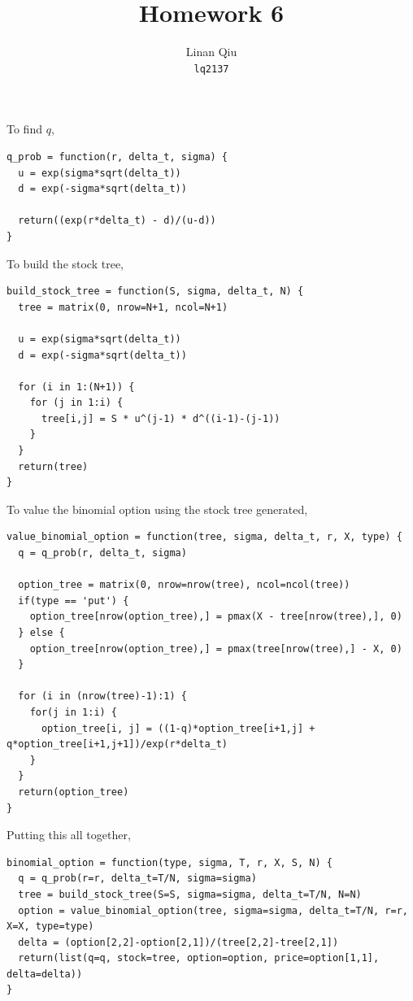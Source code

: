 \documentclass[11pt]{scrartcl}
\title{Homework 6}
\author{Linan Qiu\\\texttt{lq2137}}
\begin{document}
\maketitle

\section{}

\subsection{}

To find $q$,

\begin{lstlisting}
q_prob = function(r, delta_t, sigma) {
  u = exp(sigma*sqrt(delta_t))
  d = exp(-sigma*sqrt(delta_t))
  
  return((exp(r*delta_t) - d)/(u-d))
}
\end{lstlisting}

To build the stock tree,

\begin{lstlisting}
build_stock_tree = function(S, sigma, delta_t, N) {
  tree = matrix(0, nrow=N+1, ncol=N+1)
  
  u = exp(sigma*sqrt(delta_t))
  d = exp(-sigma*sqrt(delta_t))
  
  for (i in 1:(N+1)) {
    for (j in 1:i) {
      tree[i,j] = S * u^(j-1) * d^((i-1)-(j-1))
    }
  }
  return(tree)
}
\end{lstlisting}

To value the binomial option using the stock tree generated,

\begin{lstlisting}
value_binomial_option = function(tree, sigma, delta_t, r, X, type) {
  q = q_prob(r, delta_t, sigma)

  option_tree = matrix(0, nrow=nrow(tree), ncol=ncol(tree))
  if(type == 'put') {
    option_tree[nrow(option_tree),] = pmax(X - tree[nrow(tree),], 0)
  } else {
    option_tree[nrow(option_tree),] = pmax(tree[nrow(tree),] - X, 0)
  }

  for (i in (nrow(tree)-1):1) {
    for(j in 1:i) {
      option_tree[i, j] = ((1-q)*option_tree[i+1,j] + q*option_tree[i+1,j+1])/exp(r*delta_t)
    }
  }
  return(option_tree)
}
\end{lstlisting}

Putting this all together,

\begin{lstlisting}
binomial_option = function(type, sigma, T, r, X, S, N) {
  q = q_prob(r=r, delta_t=T/N, sigma=sigma)
  tree = build_stock_tree(S=S, sigma=sigma, delta_t=T/N, N=N)
  option = value_binomial_option(tree, sigma=sigma, delta_t=T/N, r=r, X=X, type=type)
  delta = (option[2,2]-option[2,1])/(tree[2,2]-tree[2,1])
  return(list(q=q, stock=tree, option=option, price=option[1,1], delta=delta))
}
\end{lstlisting}
\end{document}

